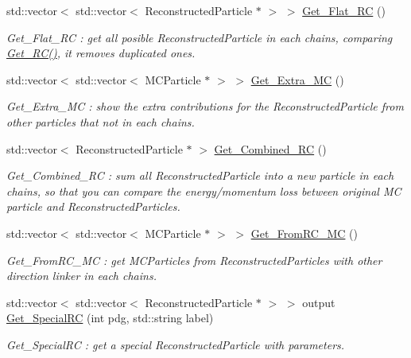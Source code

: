 \begin{DoxyCompactItemize}
std::vector$<$ std::vector$<$ ReconstructedParticle $\ast$ $>$ $>$ \hyperlink{classToolSet_1_1CChain__Vec_af8c4b4a166397de13996edf3aa3190e7}{Get\_\-Flat\_\-RC} ()
\begin{DoxyCompactList}\small\item\em Get\_\-Flat\_\-RC : get all posible ReconstructedParticle in each chains, comparing \hyperlink{classToolSet_1_1CChain__Vec_a790838ea04f22624ad047e8e3f351db5}{Get\_\-RC()}, it removes duplicated ones. \item\end{DoxyCompactList}\item 
std::vector$<$ std::vector$<$ MCParticle $\ast$ $>$ $>$ \hyperlink{classToolSet_1_1CChain__Vec_ac0d39c70d1e3f0498374b1549ea34019}{Get\_\-Extra\_\-MC} ()
\begin{DoxyCompactList}\small\item\em Get\_\-Extra\_\-MC : show the extra contributions for the ReconstructedParticle from other particles that not in each chains. \item\end{DoxyCompactList}\item 
std::vector$<$ ReconstructedParticle $\ast$ $>$ \hyperlink{classToolSet_1_1CChain__Vec_a9a4356193e3c851e7fa16c3a8158e959}{Get\_\-Combined\_\-RC} ()
\begin{DoxyCompactList}\small\item\em Get\_\-Combined\_\-RC : sum all ReconstructedParticle into a new particle in each chains, so that you can compare the energy/momentum loss between original MC particle and ReconstructedParticles. \item\end{DoxyCompactList}\item 
std::vector$<$ std::vector$<$ MCParticle $\ast$ $>$ $>$ \hyperlink{classToolSet_1_1CChain__Vec_ab8d0093a6613c407e546d988ef5d8e0a}{Get\_\-FromRC\_\-MC} ()
\begin{DoxyCompactList}\small\item\em Get\_\-FromRC\_\-MC : get MCParticles from ReconstructedParticles with other direction linker in each chains. \item\end{DoxyCompactList}\item 
std::vector$<$ std::vector$<$ ReconstructedParticle $\ast$ $>$ $>$ output \hyperlink{classToolSet_1_1CChain__Vec_a6c296f6a145769c5a8d9fd7ab6d1c5be}{Get\_\-SpecialRC} (int pdg, std::string label)
\begin{DoxyCompactList}\small\item\em Get\_\-SpecialRC : get a special ReconstructedParticle with parameters. \item\end{DoxyCompactList}\item 

\end{DoxyCompactItemize}
